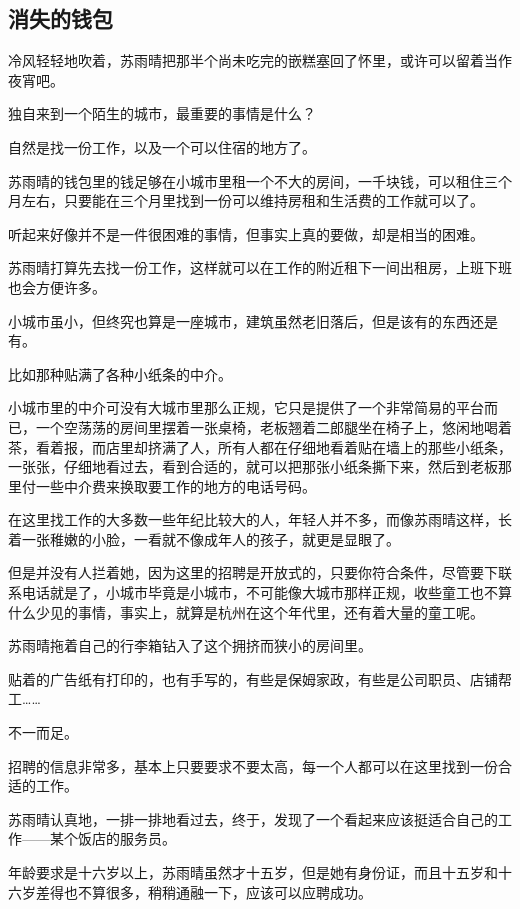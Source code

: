 \subsection{消失的钱包}

冷风轻轻地吹着，苏雨晴把那半个尚未吃完的嵌糕塞回了怀里，或许可以留着当作夜宵吧。

独自来到一个陌生的城市，最重要的事情是什么？

自然是找一份工作，以及一个可以住宿的地方了。

苏雨晴的钱包里的钱足够在小城市里租一个不大的房间，一千块钱，可以租住三个月左右，只要能在三个月里找到一份可以维持房租和生活费的工作就可以了。

听起来好像并不是一件很困难的事情，但事实上真的要做，却是相当的困难。

苏雨晴打算先去找一份工作，这样就可以在工作的附近租下一间出租房，上班下班也会方便许多。

小城市虽小，但终究也算是一座城市，建筑虽然老旧落后，但是该有的东西还是有。

比如那种贴满了各种小纸条的中介。

小城市里的中介可没有大城市里那么正规，它只是提供了一个非常简易的平台而已，一个空荡荡的房间里摆着一张桌椅，老板翘着二郎腿坐在椅子上，悠闲地喝着茶，看着报，而店里却挤满了人，所有人都在仔细地看着贴在墙上的那些小纸条，一张张，仔细地看过去，看到合适的，就可以把那张小纸条撕下来，然后到老板那里付一些中介费来换取要工作的地方的电话号码。

在这里找工作的大多数一些年纪比较大的人，年轻人并不多，而像苏雨晴这样，长着一张稚嫩的小脸，一看就不像成年人的孩子，就更是显眼了。

但是并没有人拦着她，因为这里的招聘是开放式的，只要你符合条件，尽管要下联系电话就是了，小城市毕竟是小城市，不可能像大城市那样正规，收些童工也不算什么少见的事情，事实上，就算是杭州在这个年代里，还有着大量的童工呢。

苏雨晴拖着自己的行李箱钻入了这个拥挤而狭小的房间里。

贴着的广告纸有打印的，也有手写的，有些是保姆家政，有些是公司职员、店铺帮工……

不一而足。

招聘的信息非常多，基本上只要要求不要太高，每一个人都可以在这里找到一份合适的工作。

苏雨晴认真地，一排一排地看过去，终于，发现了一个看起来应该挺适合自己的工作——某个饭店的服务员。

年龄要求是十六岁以上，苏雨晴虽然才十五岁，但是她有身份证，而且十五岁和十六岁差得也不算很多，稍稍通融一下，应该可以应聘成功。

